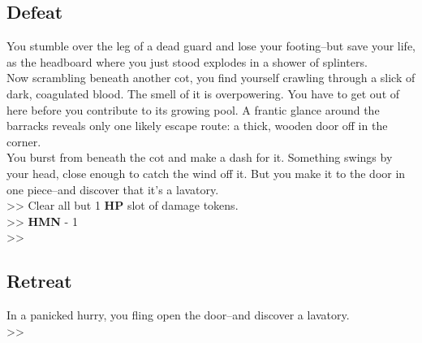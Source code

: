 \subsection*{Defeat}
You stumble over the leg of a dead guard and lose your footing--but save your life, as the headboard where you just stood explodes in a shower of splinters.\\

Now scrambling beneath another cot, you find yourself crawling through a slick of dark, coagulated blood. The smell of it is overpowering. You have to get out of here before you contribute to its growing pool. A frantic glance around the barracks reveals only one likely escape route: a thick, wooden door off in the corner.\\

You burst from beneath the cot and make a dash for it. Something swings by your head, close enough to catch the wind off it. But you make it to the door in one piece--and discover that it’s a lavatory.\\

>> Clear all but 1 \textbf{HP} slot of damage tokens.\\
>> \textbf{HMN} - 1\\
>> 

\subsection*{Retreat}
In a panicked hurry, you fling open the door--and discover a lavatory.\\

>> 